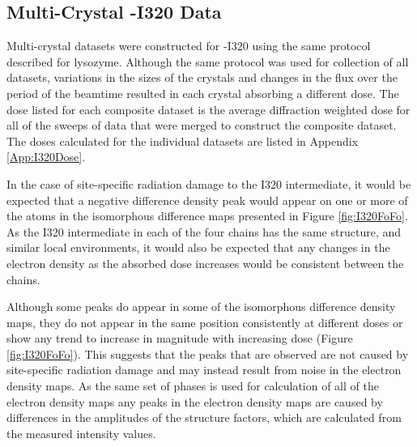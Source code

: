 \clearpage

\subsection{Multi-Crystal \atpdx -I320 Data}
Multi-crystal datasets were constructed for \atpdx -I320 using the same protocol described for lysozyme. Although the same protocol was used for collection of all datasets, variations in the sizes of the crystals and changes in the flux over the period of the beamtime resulted in each crystal absorbing a different dose. The dose listed for each composite dataset is the average diffraction weighted dose for all of the sweeps of data that were merged to construct the composite dataset. The doses calculated for the individual datasets are listed in Appendix \ref{App:I320Dose}.  


In the case of site-specific radiation damage to the I320 intermediate, it would be expected that a negative difference density peak would appear on one or more of the atoms in the isomorphous difference maps presented in Figure \ref{fig:I320FoFo}. As the I320 intermediate in each of the four chains has the same structure, and similar local environments, it would also be expected that any changes in the electron density as the absorbed dose increases would be consistent between the chains. 

Although some peaks do appear in some of the isomorphous difference density maps, they do not appear in the same position consistently at different doses or show any trend to increase in magnitude with increasing dose (Figure \ref{fig:I320FoFo}). This suggests that the peaks that are observed are not caused by site-specific radiation damage and may instead result from noise in the electron density maps. As the same set of phases is used for calculation of all of the electron density maps any peaks in the electron density maps are caused by differences in the amplitudes of the structure factors, which are calculated from the measured intensity values.   
 
